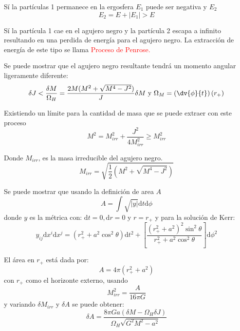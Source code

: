 \documentclass[../main]{subfiles}
\begin{document}
Sí la partículas 1 permanece en la ergosfera $E_1$ puede ser negativa y $E_2$
\begin{equation}
    E_2=E+|E_1|>E
\end{equation}

Sí la partícula 1 cae en el agujero negro y la partícula 2 escapa a infinito resultando en una perdida de energía para el agujero negro. La extracción de energía de este tipo se llama \textcolor{red}{Proceso de Penrose.}

Se puede mostrar que el agujero negro resultante tendrá un momento angular ligeramente diferente:
\begin{equation}
    \delta J < \dfrac{\delta M}{\Omega_H}=\dfrac{2M(M^2+\sqrt{M^4-J^2})}{J}\delta M \ \text{y} \ \Omega_M=\left(\dv{\phi}{t}\right)(r_+)
\end{equation}

Existiendo un límite para la cantidad de masa que se puede extraer con este proceso
\begin{equation}
    M^2=M^2_{irr}+\dfrac{J^2}{4M^2_{irr}}\geq M^2_{irr}
\end{equation}

Donde $M_{irr}$, es la masa irreducible del agujero negro.
\begin{equation}
    M_{irr}=\sqrt{\dfrac{1}{2}\left(M^2+\sqrt{M^4-J^2}\right)}
\end{equation}

Se puede mostrar que usando la definición de area $A$
\begin{equation}
    A=\int \sqrt{|y|}\mathrm{d}t \mathrm{d}\phi
\end{equation}
donde $y$ es la métrica con: $\mathrm{d}t=0, \mathrm{d}r=0$ y $r=r_+$ y para la solución de Kerr:
\begin{equation}
    y_{ij}\mathrm{d}x^{i}\mathrm{d}x^{j}=(r^2_{+}+a^2\cos^2 \theta)\mathrm{d}t^2+\left[\dfrac{(r^2_{+} +a^2)^2\sin^2 \theta}{r^2_{+} +a^2\cos^2 \theta}\right]\mathrm{d}\phi^2
\end{equation}

El área en $r_+$ está dada por:
\begin{equation}
    A=4\pi(r^2_{+}+a^2)
\end{equation}
con $r_+$ como el horizonte externo, usando 
\begin{equation}
    M^2_{irr}=\dfrac{A}{16\pi G}
\end{equation}
y variando $\delta M_{irr}$ y $\delta A$ se puede obtener:
\begin{equation}
    \delta A=\dfrac{8\pi G a(\delta M-\Omega_H \delta J)}{\Omega_H\sqrt{G^2 M^2-a^2}}
\end{equation}
\end{document}
